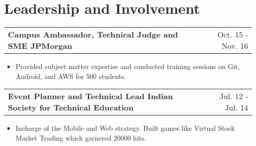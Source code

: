 \documentclass[a4paper,10pt]{article}
\makeatletter
\newcommand{\projectHeading}[2]{
    \begin{tabular*}{1\textwidth}{l@{\extracolsep{\fill}}r}
      \large{\textbf{#1}} & \small{#2} 
    \end{tabular*}
}
\newcommand{\resumeItemListStart}{\begin{itemize}[topsep=3pt, parsep=1pt, listparindent=0pt, itemindent=0pt, itemsep=0.5pt, leftmargin=*]}
\newcommand{\resumeItemListEnd}{\end{itemize}}
\makeatother
\begin{document}

\section{Leadership and Involvement}
    
    \projectHeading{Campus Ambassador, Technical Judge and SME \textbar{} JPMorgan}{Oct. 15 - Nov. 16}
    \resumeItemListStart
    	\item\small{Provided subject matter expertise and conducted training sessions on Git, Android, and AWS for 500 students.}
    \resumeItemListEnd
    
    \projectHeading{Event Planner and Technical Lead \textbar{} Indian Society for Technical Education }{Jul. 12 - Jul. 14}
    \resumeItemListStart
    	\item\small{Incharge of the Mobile and Web strategy. Built games like Virtual Stock Market Trading which garnered 20000 hits.}
    \resumeItemListEnd
    

\end{document}
